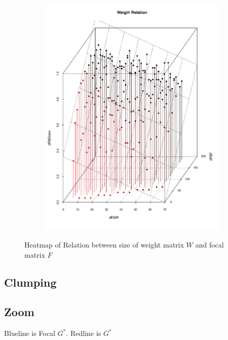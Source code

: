\documentclass{itatnew}
\begin{document}
\begin{figure}[htp]
\begin{subfigure}{\linewidth}
    \includegraphics[width=\linewidth]{images/WeightRelationDown}
    \label{fig:WeightRealtion}
  \end{subfigure}
  \caption{Heatmap of Relation between size of weight matrix $W$ and focal matrix $F$}
  \label{fig:RealtionDown}
\end{figure}
\subsection{Clumping}

\subsection{Zoom}

Blueline is Focal $G^*$. Redline is $G^*$
\end{document}
